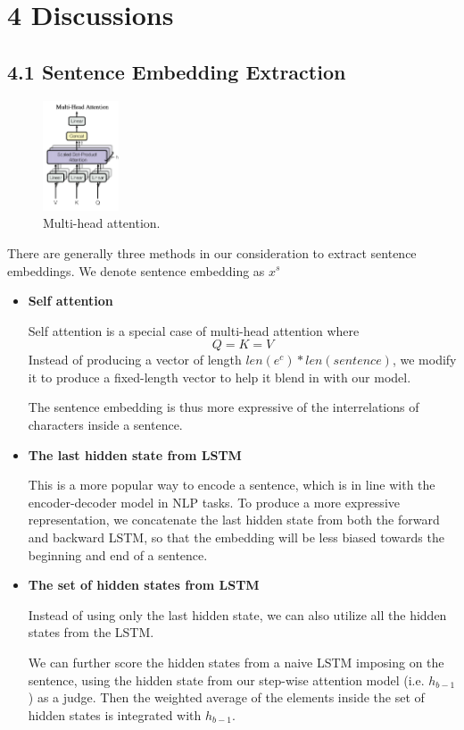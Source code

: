 \documentclass[letterpaper]{article} %
\begin{document}
\section{4 Discussions}
\label{sec:disc}
\subsection{4.1 Sentence Embedding Extraction}

\begin{figure}
\label{fig:multi-head}
\centering
\includegraphics[width=0.2\textwidth]{multi-head.png}
\caption{Multi-head attention.}
\end{figure}
There are generally three methods in our consideration to extract sentence embeddings. We denote sentence embedding as $x^s$

\begin{itemize}
    \item \textbf{Self attention}
    
    Self attention is a special case of multi-head attention \cite{Vaswani2017AttentionIA} where
    \begin{equation}
        Q = K = V
    \end{equation}
    Instead of producing a vector of length $len(e^c)*len(sentence)$, we modify it to produce a fixed-length vector to help it blend in with our model.
    
    The sentence embedding is thus more expressive of the interrelations of characters inside a sentence.
    
    \item \textbf{The last hidden state from LSTM}
    
    This is a more popular way to encode a sentence, which is in line with the encoder-decoder model in NLP tasks. To produce a more expressive representation, we concatenate the last hidden state from both the forward and backward LSTM, so that the embedding will be less biased towards the beginning and end of a sentence.
    
    \item \textbf{The set of hidden states from LSTM}
    
    Instead of using only the last hidden state, we can also utilize all the hidden states from the LSTM.
    
    We can further score the hidden states from a naive LSTM imposing on the sentence, using the hidden state from our step-wise attention model (i.e. $h_{b-1}$) as a judge. Then the weighted average of the elements inside the set of hidden states is integrated with $h_{b-1}$.
    
\end{itemize}
\end{document}
